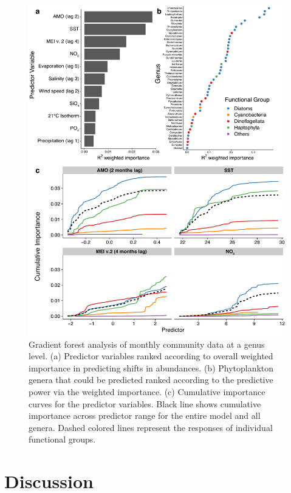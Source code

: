 \documentclass[draft]{agujournal2019}
\begin{document}
    \begin{figure}
    \noindent\includegraphics[width=\textwidth]{fig/Figure6_GF_output_FINAL_v2.pdf}
    \caption{Gradient forest analysis of monthly community data at a genus level. (a) Predictor variables ranked according to overall weighted importance in predicting shifts in abundances. (b) Phytoplankton genera that could be predicted ranked according to the predictive power via the weighted importance. (c) Cumulative importance curves for the predictor variables. Black line shows cumulative importance across predictor range for the entire model and all genera. Dashed colored lines represent the responses of individual functional groups.}
    \label{fig:GF}
    \end{figure}
    
    



\section{Discussion}
\end{document}
